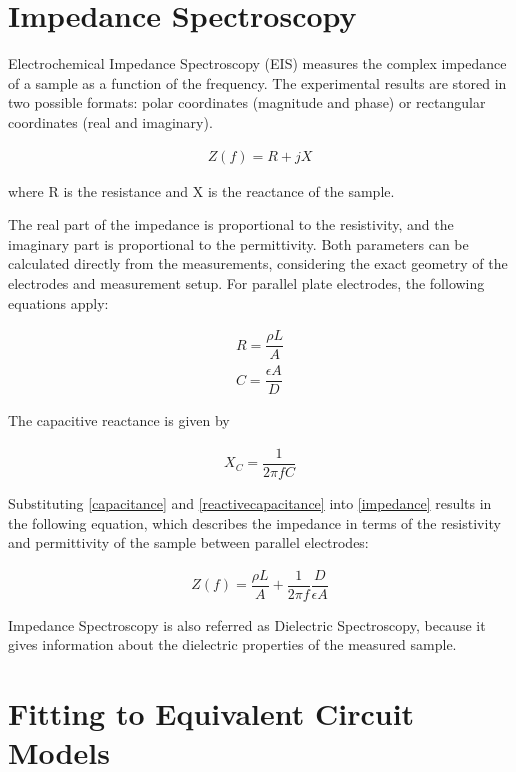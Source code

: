 \documentclass[10pt,a4paper,oneside]{memoir}
\begin{document}
\section{Impedance Spectroscopy}

Electrochemical Impedance Spectroscopy (EIS) measures the complex impedance of a sample as a function of the frequency. The experimental results are stored in two possible formats: polar coordinates (magnitude and phase) or rectangular coordinates (real and imaginary).

\begin{align} \label{impedance}
	Z(f) = R + jX
\end{align}

where R is the resistance and X is the reactance of the sample.

The real part of the impedance is proportional to the resistivity, and the imaginary part is proportional to the permittivity. Both parameters can be calculated directly from the measurements, considering the exact geometry of the electrodes and measurement setup. For parallel plate electrodes, the following equations apply:

\begin{align}
R = \dfrac{\rho L}{A} \label{resistance} \\
C = \dfrac{\epsilon A}{D} \label{capacitance}
\end{align}

The capacitive reactance is given by

\begin{align}
X_C = \dfrac{1}{2\pi{}fC}	\label{reactivecapacitance}
\end{align}

Substituting \eqref{capacitance} and \eqref{reactivecapacitance} into \eqref{impedance} results in the following equation, which describes the impedance in terms of the resistivity and permittivity of the sample between parallel electrodes:

\begin{align}
Z(f) = \dfrac{\rho L}{A} + \dfrac{1}{2\pi{}f} \dfrac{D}{\epsilon A}
\end{align}

Impedance Spectroscopy is also referred as Dielectric Spectroscopy, because it gives information about the dielectric properties of the measured sample.

\clearpage
\section{Fitting to Equivalent Circuit Models}
\end{document}
